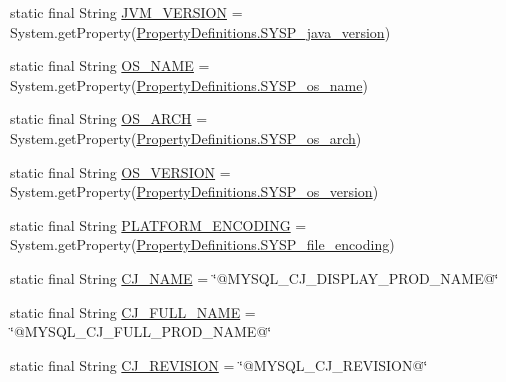 \begin{DoxyCompactItemize}
static final String \mbox{\hyperlink{classcom_1_1mysql_1_1cj_1_1_constants_a776cda170b97e4dd81cade47a4f17437}{J\+V\+M\+\_\+\+V\+E\+R\+S\+I\+ON}} = System.\+get\+Property(\mbox{\hyperlink{classcom_1_1mysql_1_1cj_1_1conf_1_1_property_definitions_a26836091c7698711cc07879dcd93101b}{Property\+Definitions.\+S\+Y\+S\+P\+\_\+java\+\_\+version}})
\item 
static final String \mbox{\hyperlink{classcom_1_1mysql_1_1cj_1_1_constants_ace66e5c19e425e7546de210a129720ee}{O\+S\+\_\+\+N\+A\+ME}} = System.\+get\+Property(\mbox{\hyperlink{classcom_1_1mysql_1_1cj_1_1conf_1_1_property_definitions_affddcdb4224734f2d11b00c102129fd0}{Property\+Definitions.\+S\+Y\+S\+P\+\_\+os\+\_\+name}})
\item 
static final String \mbox{\hyperlink{classcom_1_1mysql_1_1cj_1_1_constants_ab856418642fd10aa0794159a27cb2e9e}{O\+S\+\_\+\+A\+R\+CH}} = System.\+get\+Property(\mbox{\hyperlink{classcom_1_1mysql_1_1cj_1_1conf_1_1_property_definitions_aad0eadeb6d00c44a7e2558ff1d4e999e}{Property\+Definitions.\+S\+Y\+S\+P\+\_\+os\+\_\+arch}})
\item 
static final String \mbox{\hyperlink{classcom_1_1mysql_1_1cj_1_1_constants_ad1f1e8ee9d3e10a57303e73dc35df668}{O\+S\+\_\+\+V\+E\+R\+S\+I\+ON}} = System.\+get\+Property(\mbox{\hyperlink{classcom_1_1mysql_1_1cj_1_1conf_1_1_property_definitions_a5db67a2d1c7d5424b1b8e46c506fc350}{Property\+Definitions.\+S\+Y\+S\+P\+\_\+os\+\_\+version}})
\item 
static final String \mbox{\hyperlink{classcom_1_1mysql_1_1cj_1_1_constants_a52bb2534146e4771d2efc27419e1e17f}{P\+L\+A\+T\+F\+O\+R\+M\+\_\+\+E\+N\+C\+O\+D\+I\+NG}} = System.\+get\+Property(\mbox{\hyperlink{classcom_1_1mysql_1_1cj_1_1conf_1_1_property_definitions_a66487c1a3fb2e2e4e317c1dd76cfbc41}{Property\+Definitions.\+S\+Y\+S\+P\+\_\+file\+\_\+encoding}})
\item 
static final String \mbox{\hyperlink{classcom_1_1mysql_1_1cj_1_1_constants_a4f4a6063380597d03c4ff19e5efdd3e6}{C\+J\+\_\+\+N\+A\+ME}} = \char`\"{}@M\+Y\+S\+Q\+L\+\_\+\+C\+J\+\_\+\+D\+I\+S\+P\+L\+A\+Y\+\_\+\+P\+R\+O\+D\+\_\+\+N\+A\+ME@\char`\"{}
\item 
static final String \mbox{\hyperlink{classcom_1_1mysql_1_1cj_1_1_constants_aaa6a79904f228b32972bf84513000f5e}{C\+J\+\_\+\+F\+U\+L\+L\+\_\+\+N\+A\+ME}} = \char`\"{}@M\+Y\+S\+Q\+L\+\_\+\+C\+J\+\_\+\+F\+U\+L\+L\+\_\+\+P\+R\+O\+D\+\_\+\+N\+A\+ME@\char`\"{}
\item 
static final String \mbox{\hyperlink{classcom_1_1mysql_1_1cj_1_1_constants_aaef32399ccf062bb3b40e6fae6e49859}{C\+J\+\_\+\+R\+E\+V\+I\+S\+I\+ON}} = \char`\"{}@M\+Y\+S\+Q\+L\+\_\+\+C\+J\+\_\+\+R\+E\+V\+I\+S\+I\+ON@\char`\"{}

\end{DoxyCompactItemize}
